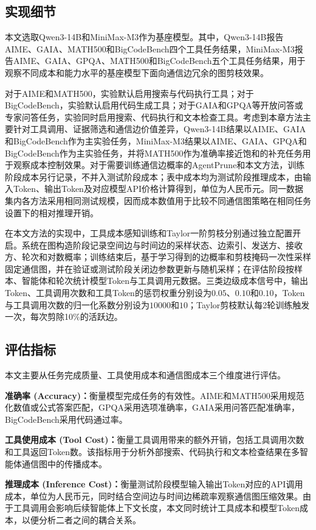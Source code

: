 \subsection{实现细节}
本文选取Qwen3-14B和MiniMax-M3\cite{ref60}作为基座模型。其中，Qwen3-14B报告AIME、GAIA、MATH500和BigCodeBench四个工具任务结果，MiniMax-M3报告AIME、GAIA、GPQA、MATH500和BigCodeBench五个工具任务结果，用于观察不同成本和能力水平的基座模型下面向通信边冗余的图剪枝效果。

对于AIME和MATH500，实验默认启用搜索与代码执行工具；对于BigCodeBench，实验默认启用代码生成工具；对于GAIA和GPQA等开放问答或专家问答任务，实验同时启用搜索、代码执行和文本检查工具。考虑到本章方法主要针对工具调用、证据筛选和通信边价值差异，Qwen3-14B结果以AIME、GAIA和BigCodeBench作为主实验任务，MiniMax-M3结果以AIME、GAIA、GPQA和BigCodeBench作为主实验任务，并将MATH500作为准确率接近饱和的补充任务用于观察成本控制效果。对于需要训练通信边概率的AgentPrune和本文方法，训练阶段成本另行记录，不并入测试阶段成本；表中成本均为测试阶段推理成本，由输入Token、输出Token及对应模型API价格计算得到，单位为人民币元。同一数据集内各方法采用相同测试规模，因而成本数值用于比较不同通信图策略在相同任务设置下的相对推理开销。

在本文方法的实现中，工具成本感知训练和Taylor一阶剪枝分别通过独立配置开启。系统在图构造阶段记录空间边与时间边的采样状态、边索引、发送方、接收方、轮次和对数概率；训练结束后，基于学习得到的边概率和剪枝掩码一次性采样固定通信图，并在验证或测试阶段关闭边参数更新与随机采样；在评估阶段按样本、智能体和轮次统计模型Token与工具调用元数据。三类边级成本信号中，输出Token、工具调用次数和工具Token的惩罚权重分别设为$0.05$、$0.10$和$0.10$，Token与工具调用次数的归一化系数分别设为$10000$和$10$；Taylor剪枝默认每2轮训练触发一次，每次剪除10\%的活跃边。

\subsection{评估指标}
本文主要从任务完成质量、工具使用成本和通信图成本三个维度进行评估。
\par \textbf{准确率 (Accuracy)：}衡量模型完成任务的有效性。AIME和MATH500采用规范化数值或公式答案匹配，GPQA采用选项准确率，GAIA采用问答匹配准确率，BigCodeBench采用代码通过率。
\par \textbf{工具使用成本 (Tool Cost)：}衡量工具调用带来的额外开销，包括工具调用次数和工具返回Token数。该指标用于分析外部搜索、代码执行和文本检查结果在多智能体通信图中的传播成本。
\par \textbf{推理成本 (Inference Cost)：}衡量测试阶段模型输入输出Token对应的API调用成本，单位为人民币元，同时结合空间边与时间边稀疏率观察通信图压缩效果。由于工具调用会影响后续智能体上下文长度，本文同时统计工具成本和模型Token成本，以便分析二者之间的耦合关系。


